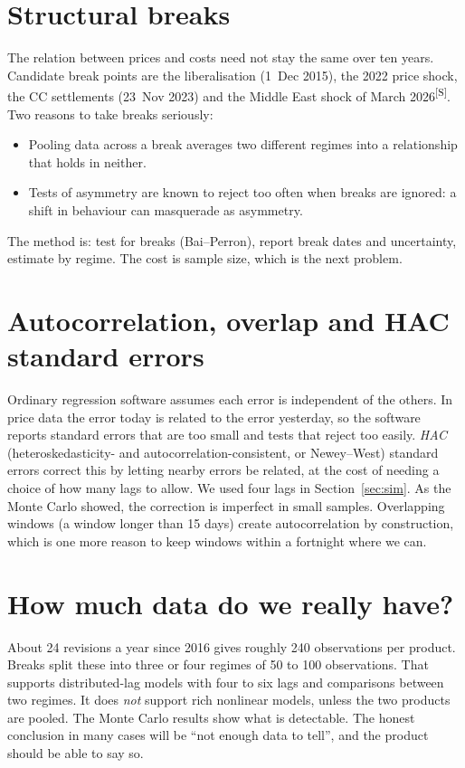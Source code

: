 \documentclass[11pt,a4paper]{article}
\newcommand{\tagS}{\textsuperscript{\textcolor{orange!80!black}{\textsf{\scriptsize[S]}}}}
\theoremstyle{definition}
\begin{document}
\section{Structural breaks}

The relation between prices and costs need not stay the same over ten years. Candidate break points are the liberalisation (1~Dec 2015), the 2022 price shock, the CC settlements (23~Nov 2023) and the Middle East shock of March 2026\tagS. Two reasons to take breaks seriously:
\begin{itemize}
\item Pooling data across a break averages two different regimes into a relationship that holds in neither.
\item Tests of asymmetry are known to reject too often when breaks are ignored\cite{robust}: a shift in behaviour can masquerade as asymmetry.
\end{itemize}
The method is: test for breaks (Bai--Perron), report break dates and uncertainty, estimate by regime. The cost is sample size, which is the next problem.

\section{Autocorrelation, overlap and HAC standard errors}\label{sec:hac}

Ordinary regression software assumes each error is independent of the others. In price data the error today is related to the error yesterday, so the software
reports standard errors that are too small and tests that reject too easily. \emph{HAC} (heteroskedasticity- and autocorrelation-consistent, or Newey--West) standard errors correct this by letting nearby errors be related, at the cost of needing a choice of how many lags to allow. We used four lags in
Section~\ref{sec:sim}. As the Monte Carlo showed, the correction is imperfect in small samples. Overlapping windows (a window longer than 15 days) create autocorrelation by construction, which is one more reason to keep windows within a fortnight where we can.

\section{How much data do we really have?}

About 24 revisions a year since 2016 gives roughly 240 observations per product. Breaks split these into three or four regimes of 50 to 100 observations. That supports distributed-lag models with four to six lags and comparisons between two regimes. It does \emph{not} support rich nonlinear models, unless the two
products are pooled. The Monte Carlo results show what is detectable. The honest conclusion in many cases will be ``not enough data to tell'', and the product should be able to say so.
\end{document}

